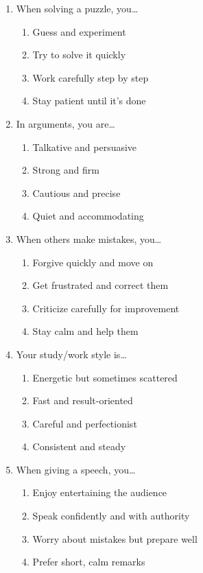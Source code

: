 \documentclass[12pt]{article}
\begin{document}
\begin{enumerate}[label=\textbf{Q\arabic*.}]
\item When solving a puzzle, you…
\begin{enumerate}[label=(\Alph*)]
\item Guess and experiment
\item Try to solve it quickly
\item Work carefully step by step
\item Stay patient until it’s done
\end{enumerate}

\item In arguments, you are…
\begin{enumerate}[label=(\Alph*)]
\item Talkative and persuasive
\item Strong and firm
\item Cautious and precise
\item Quiet and accommodating
\end{enumerate}

\item When others make mistakes, you…
\begin{enumerate}[label=(\Alph*)]
\item Forgive quickly and move on
\item Get frustrated and correct them
\item Criticize carefully for improvement
\item Stay calm and help them
\end{enumerate}

\item Your study/work style is…
\begin{enumerate}[label=(\Alph*)]
\item Energetic but sometimes scattered
\item Fast and result-oriented
\item Careful and perfectionist
\item Consistent and steady
\end{enumerate}

\item When giving a speech, you…
\begin{enumerate}[label=(\Alph*)]
\item Enjoy entertaining the audience
\item Speak confidently and with authority
\item Worry about mistakes but prepare well
\item Prefer short, calm remarks
\end{enumerate}


\end{enumerate}
\end{document}
